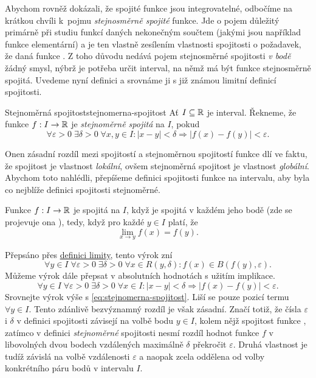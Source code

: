 Abychom rovněž dokázali, že spojité funkce jsou integrovatelné, odbočíme na
krátkou chvíli k~pojmu \emph{stejnosměrně spojité} funkce. Jde o pojem důležitý
primárně při studiu funkcí daných nekonečným součtem (jakými jsou například
funkce elementární) a je ten vlastně zesílením vlastnosti spojitosti o
požadavek, že daná funkce . Z toho důvodu nedává
pojem stejnosměrné spojitosti \emph{v bodě} žádný smysl, nýbrž je potřeba určit
interval, na němž má být funkce stejnosměrně spojitá. Uvedeme nyní definici a
srovnáme ji s již známou limitní definicí spojitosti.

\begin{definition}{Stejnoměrná spojitost}{stejnomerna-spojitost}
 Ať $I \subseteq \mathbb{R}$ je interval. Řekneme, že funkce $f:I \to \mathbb{R}$ je
 \emph{stejnoměrně spojitá} na $I$, pokud
 \begin{equation}
  \label{eq:stejnomerna-spojitost}
  \forall \varepsilon>0 \; \exists \delta>0 \; \forall x,y \in I :|x-y|<\delta
  \Rightarrow |f(x) - f(y)|<\varepsilon.
 \end{equation}
\end{definition}

Onen zásadní rozdíl mezi spojitostí a stejnoměrnou spojitostí funkce dlí ve
faktu, že spojitost je vlastnost \emph{lokální}, ovšem stejnoměrná spojitost je
vlastnost \emph{globální}. Abychom toto nahlédli, přepíšeme definici spojitosti
funkce na intervalu, aby byla co nejblíže definici spojitosti stejnoměrné.

Funkce $f:I \to \mathbb{R}$ je spojitá na $I$, když je spojitá v každém jeho bodě (zde
se projevuje ona ), tedy, když pro každé $y \in I$ platí, že
\[
 \lim_{x \to y} f(x) = f(y).
\]

Přepsáno přes \hyperref[def:oboustranna-limita-funkce]{definici limity}, tento
výrok zní
\[
 \forall y \in I \; \forall \varepsilon>0 \; \exists \delta>0 \; \forall x \in
 R(y,\delta) : f(x) \in B(f(y),\varepsilon).
\]
Můžeme výrok dále přepsat v absolutních hodnotách s užitím implikace.
\[
 \forall y \in I \; \forall \varepsilon>0 \; \exists \delta>0 \; \forall x \in I
 : |x - y| < \delta \Rightarrow |f(x) - f(y)| < \varepsilon.
\]
Srovnejte výrok výše s \eqref{eq:stejnomerna-spojitost}. Liší se pouze pozicí
termu $ \forall y \in I$. Tento zdánlivě bezvýznamný rozdíl je však zásadní.
Značí totiž, že čísla $\varepsilon$ i $\delta$ v definici spojitosti závisejí na
volbě bodu $y \in I$, kolem nějž spojitost funkce , zatímco v
definici \emph{stejnoměrné} spojitosti nesmí rozdíl hodnot funkce $f$ v
libovolných dvou bodech vzdálených maximálně $\delta$ překročit $\varepsilon$.
Druhá vlastnost je tudíž závislá na volbě vzdálenosti $\varepsilon$ a naopak
zcela oddělena od volby konkrétního páru bodů v intervalu $I$.


